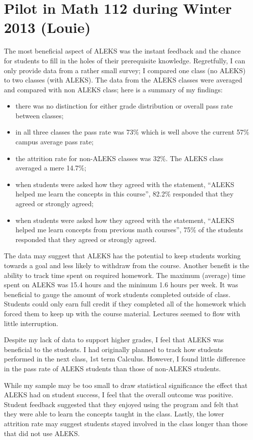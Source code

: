 \section{Pilot in Math 112 during Winter 2013 (Louie)}
The most beneficial aspect of ALEKS was the instant feedback and the chance for students to fill in the holes of their prerequisite knowledge. Regretfully, I can only provide data from a rather small survey; I compared one class (no ALEKS) to two classes (with ALEKS). The data from the ALEKS classes were averaged and compared with non ALEKS class; here is a summary of my findings:
\begin{itemize}
	\item there was no distinction for either grade distribution or overall pass rate between classes;
	\item in all three classes the pass rate was 73\% which is well above the current 57\% campus average pass rate;
	\item the attrition rate for non-ALEKS classes was 32\%. The ALEKS class averaged a mere 14.7\%;
\item 	when students were asked how they agreed with the statement, ``ALEKS helped me learn the concepts in this course'',  82.2\% responded that they agreed or strongly agreed;
\item	when students were asked how they agreed with the statement, ``ALEKS helped me learn concepts from previous math courses'', 75\% of the students responded that they agreed or strongly agreed.
\end{itemize}
The data may suggest that ALEKS has the potential to keep students working towards a goal and less likely to withdraw from the course. Another benefit is the ability to track time spent on required homework. The maximum (average) time spent on ALEKS was 15.4 hours and the minimum 1.6 hours per week. It was beneficial to gauge the amount of work students completed outside of class. Students could only earn full credit if they completed all of the homework which forced them to keep up with the course material. Lectures seemed to flow with little interruption. 

Despite my lack of data to support higher grades, I feel that ALEKS was beneficial to the students. I had originally planned to track how students performed in the next class, 1st term Calculus. However, I found little difference in the pass rate of ALEKS students than those of non-ALEKS students. 

While my sample may be too small to draw statistical significance the effect that ALEKS had on student success, I feel that the overall outcome was positive. Student feedback suggested that they enjoyed using the program and felt that they were able to learn the concepts taught in the class. Lastly, the lower attrition rate may suggest students stayed involved in the class longer than those that did not use ALEKS. 